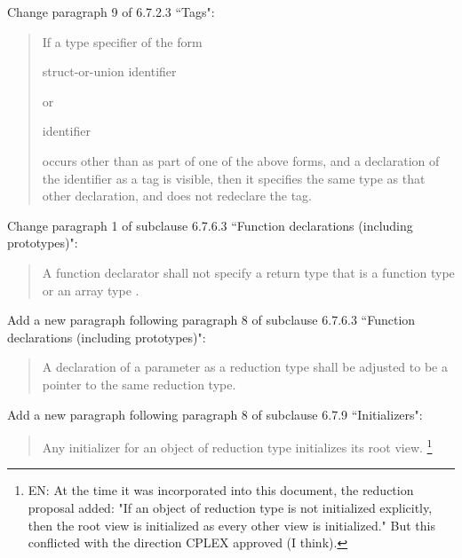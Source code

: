 Change paragraph 9 of 6.7.2.3 ``Tags":

\begin{quote}
If a type specifier of the form

\begin{bnf}
struct-or-union identifier
\end{bnf}


\begin{bnf}
 
\end{bnf}

or

\begin{bnf}
 identifier
\end{bnf}

occurs other than as part of one of the above forms,
and a declaration of the identifier as a tag is visible,
then it specifies the same type as that other declaration,
and does not redeclare the tag.
\end{quote}

Change paragraph 1 of subclause 6.7.6.3
``Function declarations (including prototypes)":

\begin{quote}
A function declarator shall not specify a return type
that is a function type or an array type
.
\end{quote}

Add a new paragraph following paragraph 8 of subclause 6.7.6.3
``Function declarations (including prototypes)":

\begin{quote}
A declaration of a parameter as a reduction type
shall be adjusted to be a pointer to the same reduction type.
\end{quote}

Add a new paragraph following paragraph 8
of subclause 6.7.9 ``Initializers":

\begin{quote}
Any initializer for an object of reduction type initializes its root view.
\footnote{EN:
At the time it was incorporated into this document,
the reduction proposal added:
"If an object of reduction type is not initialized explicitly,
then the root view is initialized as every other view is initialized."
But this conflicted with the direction CPLEX approved (I think).
}
\end{quote}


